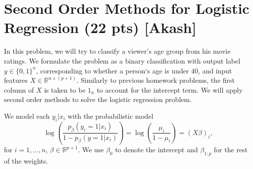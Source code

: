 \documentclass{article}
\theoremstyle{remark}
\theoremstyle{definition}
\begin{document}
\section{Second Order Methods for Logistic Regression (22 pts) [Akash]}

In this problem, we will try to classify a viewer's age group from his movie ratings. We formulate the problem as a binary classification with output label  $y \in \{0,1\}^n$, corresponding to whether a person`s age is under $40$, and input features $X \in \mathbb{R}^{n \times (p+1)}$. Similarly to previous homework problems, the first column of $X$ is taken to be $1_n$ to account for the intercept term. We will apply second order methods to solve the logistic regression problem.

We model each $y_i|x_i$ with the probabilistic model
  \[
    \log\left(\frac{p_{\beta}(y_i = 1|x_i)}{1-p_{\beta}(y =
        1|x_i)}\right) = \log\left(\frac{\mu_i}{1-\mu_i}\right) = (X\beta)_i,
  \]
  for $i=1,\ldots,n$, $\beta \in \mathbb{R}^{p+1}$. We use $\beta_0$ to denote the intercept and $\beta_{1:p}$ for the rest of the weights. 
\end{document}

